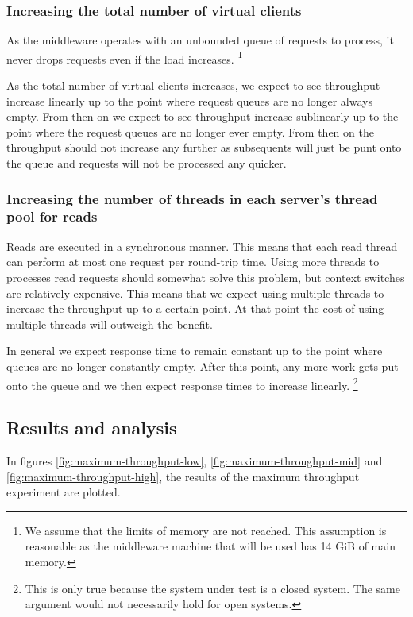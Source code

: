 \documentclass[11pt]{article}
\begin{document}
\subsubsection{Increasing the total number of virtual clients}

As the middleware operates with an unbounded queue of requests to process, it never drops requests even if the load increases.
\footnote{
  We assume that the limits of memory are not reached.
  This assumption is reasonable as the middleware machine that will be used has 14 GiB of main memory.
}

As the total number of virtual clients increases, we expect to see throughput increase linearly up to the point where request queues are no longer always empty.
From then on we expect to see throughput increase sublinearly up to the point where the request queues are no longer ever empty.
From then on the throughput should not increase any further as subsequents will just be punt onto the queue and requests will not be processed any quicker.

\subsubsection{Increasing the number of threads in each server's thread pool for reads}

Reads are executed in a synchronous manner.
This means that each read thread can perform at most one request per round-trip time.
Using more threads to processes read requests should somewhat solve this problem, but context switches are relatively expensive.
This means that we expect using multiple threads to increase the throughput up to a certain point.
At that point the cost of using multiple threads will outweigh the benefit.

In general we expect response time to remain constant up to the point where queues are no longer constantly empty.
After this point, any more work gets put onto the queue and we then expect response times to increase linearly.
\footnote{
  This is only true because the system under test is a closed system.
  The same argument would not necessarily hold for open systems.
}

\subsection{Results and analysis}

In figures \ref{fig:maximum-throughput-low}, \ref{fig:maximum-throughput-mid} and \ref{fig:maximum-throughput-high}, the results of the maximum throughput experiment are plotted.
\end{document}
